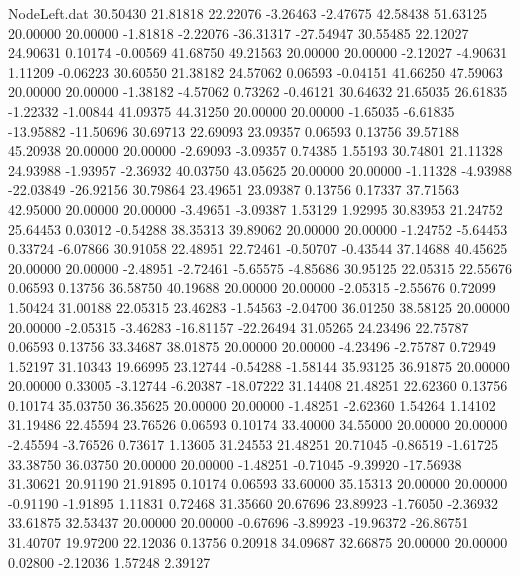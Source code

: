\begin{filecontents}{NodeLeft.dat}
  30.50430   21.81818   22.22076    -3.26463   -2.47675   42.58438   51.63125   20.00000   20.00000   -1.81818   -2.22076  -36.31317  -27.54947
  30.55485   22.12027   24.90631     0.10174   -0.00569   41.68750   49.21563   20.00000   20.00000   -2.12027   -4.90631    1.11209   -0.06223
  30.60550   21.38182   24.57062     0.06593   -0.04151   41.66250   47.59063   20.00000   20.00000   -1.38182   -4.57062    0.73262   -0.46121
  30.64632   21.65035   26.61835    -1.22332   -1.00844   41.09375   44.31250   20.00000   20.00000   -1.65035   -6.61835  -13.95882  -11.50696
  30.69713   22.69093   23.09357     0.06593    0.13756   39.57188   45.20938   20.00000   20.00000   -2.69093   -3.09357    0.74385    1.55193
  30.74801   21.11328   24.93988    -1.93957   -2.36932   40.03750   43.05625   20.00000   20.00000   -1.11328   -4.93988  -22.03849  -26.92156
  30.79864   23.49651   23.09387     0.13756    0.17337   37.71563   42.95000   20.00000   20.00000   -3.49651   -3.09387    1.53129    1.92995
  30.83953   21.24752   25.64453     0.03012   -0.54288   38.35313   39.89062   20.00000   20.00000   -1.24752   -5.64453    0.33724   -6.07866
  30.91058   22.48951   22.72461    -0.50707   -0.43544   37.14688   40.45625   20.00000   20.00000   -2.48951   -2.72461   -5.65575   -4.85686
  30.95125   22.05315   22.55676     0.06593    0.13756   36.58750   40.19688   20.00000   20.00000   -2.05315   -2.55676    0.72099    1.50424
  31.00188   22.05315   23.46283    -1.54563   -2.04700   36.01250   38.58125   20.00000   20.00000   -2.05315   -3.46283  -16.81157  -22.26494
  31.05265   24.23496   22.75787     0.06593    0.13756   33.34687   38.01875   20.00000   20.00000   -4.23496   -2.75787    0.72949    1.52197
  31.10343   19.66995   23.12744    -0.54288   -1.58144   35.93125   36.91875   20.00000   20.00000    0.33005   -3.12744   -6.20387  -18.07222
  31.14408   21.48251   22.62360     0.13756    0.10174   35.03750   36.35625   20.00000   20.00000   -1.48251   -2.62360    1.54264    1.14102
  31.19486   22.45594   23.76526     0.06593    0.10174   33.40000   34.55000   20.00000   20.00000   -2.45594   -3.76526    0.73617    1.13605
  31.24553   21.48251   20.71045    -0.86519   -1.61725   33.38750   36.03750   20.00000   20.00000   -1.48251   -0.71045   -9.39920  -17.56938
  31.30621   20.91190   21.91895     0.10174    0.06593   33.60000   35.15313   20.00000   20.00000   -0.91190   -1.91895    1.11831    0.72468
  31.35660   20.67696   23.89923    -1.76050   -2.36932   33.61875   32.53437   20.00000   20.00000   -0.67696   -3.89923  -19.96372  -26.86751
  31.40707   19.97200   22.12036     0.13756    0.20918   34.09687   32.66875   20.00000   20.00000    0.02800   -2.12036    1.57248    2.39127

\end{filecontents}

